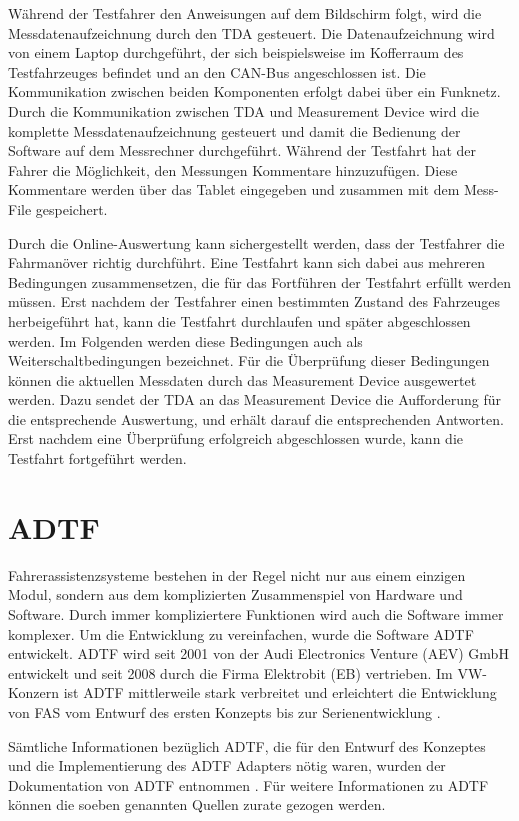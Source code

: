 \documentclass[12pt,a4paper]{report}
\begin{document}
Während der Testfahrer den Anweisungen auf dem Bildschirm folgt, wird die Messdatenaufzeichnung durch den TDA gesteuert. Die Datenaufzeichnung wird von einem Laptop durchgeführt, der sich beispielsweise im Kofferraum des Testfahrzeuges befindet und an den CAN-Bus angeschlossen ist. Die Kommunikation zwischen beiden Komponenten erfolgt dabei über ein Funknetz. Durch die Kommunikation zwischen TDA und Measurement Device wird die komplette Messdatenaufzeichnung gesteuert und damit die Bedienung der Software auf dem Messrechner durchgeführt. Während der Testfahrt hat der Fahrer die Möglichkeit, den Messungen Kommentare hinzuzufügen. Diese Kommentare werden über das Tablet eingegeben und zusammen mit dem Mess-File gespeichert. 

Durch die Online-Auswertung kann sichergestellt werden, dass der Testfahrer die Fahrmanöver richtig durchführt. Eine Testfahrt kann sich dabei aus mehreren Bedingungen zusammensetzen, die für das Fortführen der Testfahrt erfüllt werden müssen. Erst nachdem der Testfahrer einen bestimmten Zustand des Fahrzeuges herbeigeführt hat, kann die Testfahrt durchlaufen und später abgeschlossen werden. Im Folgenden werden diese Bedingungen auch als Weiterschaltbedingungen bezeichnet. Für die Überprüfung dieser Bedingungen können die aktuellen Messdaten durch das Measurement Device ausgewertet werden. Dazu sendet der TDA an das Measurement Device die Aufforderung für die entsprechende Auswertung, und erhält darauf die entsprechenden Antworten. Erst nachdem eine Überprüfung erfolgreich abgeschlossen wurde, kann die Testfahrt fortgeführt werden.
\section{ADTF}\label{sec:ADTF}
Fahrerassistenzsysteme bestehen in der Regel nicht nur aus einem einzigen Modul, sondern aus dem komplizierten Zusammenspiel von Hardware und Software. Durch immer kompliziertere Funktionen wird auch die Software immer komplexer. Um die Entwicklung zu vereinfachen, wurde die Software ADTF entwickelt. ADTF wird seit 2001 von der Audi Electronics Venture (AEV) GmbH entwickelt und seit 2008 durch die Firma Elektrobit (EB) vertrieben. Im VW-Konzern ist ADTF mittlerweile stark verbreitet und erleichtert die Entwicklung von FAS vom Entwurf des ersten Konzepts bis zur Serienentwicklung \cite{AEV}.

Sämtliche Informationen bezüglich ADTF, die für den Entwurf des Konzeptes und die Implementierung des ADTF Adapters nötig waren, wurden der Dokumentation von ADTF entnommen \cite{ADTFDokuUsers}\cite{ADTFDokuDevelopers}\cite{ADTFDokuSDK}. Für weitere Informationen zu ADTF können die soeben genannten Quellen zurate gezogen werden.
\end{document}
